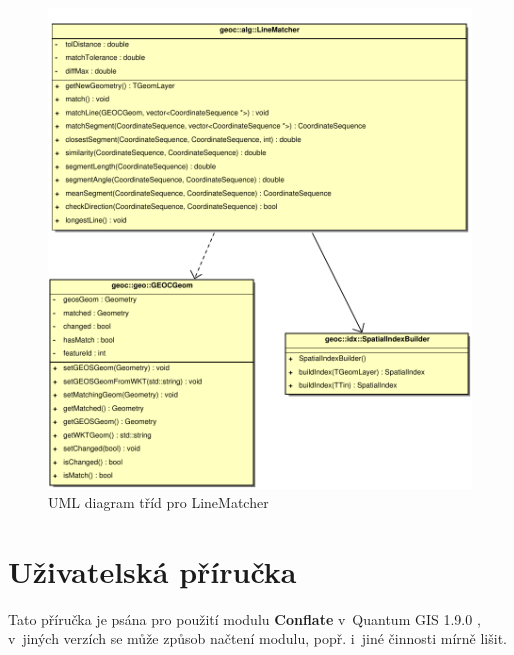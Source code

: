 \vspace{2cm}
  \begin{figure}[t]
    \centering
      \tiny
      \includegraphics[width=420pt]{./pictures/uml-lm.pdf}
      \caption{UML diagram tříd pro LineMatcher}
      \label{fig:uml-lm}
  \end{figure}

\chapter{Uživatelská příručka}
\label{priloha-prirucka}

Tato příručka je psána pro použití modulu \textbf{Conflate} v~Quantum GIS 1.9.0 , 
v~jiných verzích se může způsob načtení modulu, popř. i~jiné činnosti mírně lišit.

% 

